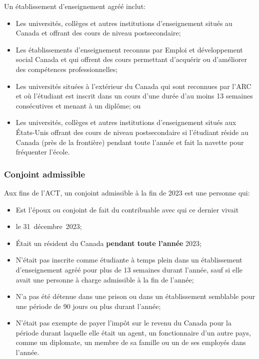 \begin{note}
	Un établissement d'enseignement agréé inclut:
	\begin{itemize}[label=]
		\item 	Les universités, collèges et autres institutions d'enseignement situés au Canada et offrant des cours de niveau postsecondaire;
		\item 	Les établissements d'enseignement reconnus par Emploi et développement social Canada et qui offrent des cours permettant d'acquérir ou d'améliorer des compétences professionnelles;
		\item 	Les universités situées à l'extérieur du Canada qui sont reconnues par l'ARC et où l'étudiant est inscrit dans un cours d'une durée d'au moins 13 semaines consécutives et menant à un diplôme; ou
		\item 	Les universités, collèges et autres institutions d'enseignement situés aux États-Unis offrant des cours de niveau postsecondaire si l'étudiant réside au Canada (près de la frontière) pendant toute l'année et fait la navette pour fréquenter l'école.
	\end{itemize}
\end{note}

\subsubsection{Conjoint admissible}
Aux fins de l'ACT, un conjoint admissible à la fin de 2023 est une personne qui:
\begin{itemize}[label=]
	\item Est l'époux ou conjoint de fait du contribuable avec qui ce dernier vivait
	\item le 31~décembre~2023;
	\item Était un résident du Canada \textbf{pendant toute l'année} 2023;
	\item N'était pas inscrite comme étudiante à temps plein dans un établissement d'enseignement agréé pour plus de 13 semaines durant l'année, sauf si elle avait une personne à charge admissible à la fin de l'année;
	\item N'a pas été détenue dans une prison ou dans un établissement semblable pour une période de 90 jours ou plus durant l'année;
	\item N'était pas exempte de payer l'impôt sur le revenu du Canada pour la période durant laquelle elle était un agent, un fonctionnaire d'un autre pays, comme un diplomate, un membre de sa famille ou un de ses employés dans l'année.
\end{itemize}

